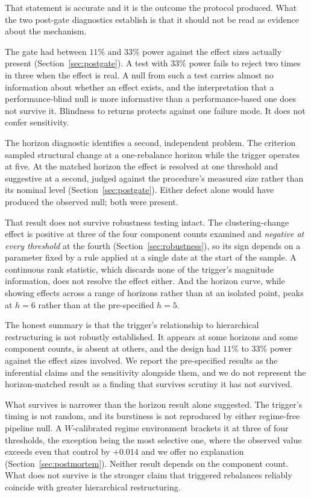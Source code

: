 \documentclass[12pt,letterpaper]{article}
\begin{document}
That statement is accurate and it is the outcome the protocol produced. What the two
post-gate diagnostics establish is that it should not be read as evidence about the
mechanism.

The gate had between $11\%$ and $33\%$ power against the effect sizes actually present
(Section~\ref{sec:postgate}). A test with $33\%$ power fails to reject two times in
three when the effect is real. A null from such a test carries almost no information
about whether an effect exists, and the interpretation that a performance-blind null is
more informative than a performance-based one does not survive it. Blindness to returns protects against one failure mode. It
does not confer sensitivity.

The horizon diagnostic identifies a second, independent problem. The criterion sampled
structural change at a one-rebalance horizon while the trigger operates at five. At the
matched horizon the effect is resolved at one threshold and suggestive at a second,
judged against the procedure's measured size rather than its nominal level
(Section~\ref{sec:postgate}). Either defect alone would have produced the observed
null; both were present.

That result does not survive robustness testing intact. The clustering-change effect is
positive at three of the four component counts examined and \emph{negative at every
threshold} at the fourth (Section~\ref{sec:robustness}), so its sign depends on a
parameter fixed by a rule applied at a single date at the start of the sample. A
continuous rank statistic, which discards none of the trigger's magnitude information,
does not resolve the effect either. And the horizon curve, while showing effects across a
range of horizons rather than at an isolated point, peaks at $h = 6$ rather than at the
pre-specified $h = 5$.

The honest summary is that the trigger's relationship to hierarchical restructuring is not
robustly established. It appears at some horizons and some component counts, is absent at
others, and the design had $11\%$ to $33\%$ power against the effect sizes involved. We
report the pre-specified results as the inferential claims and the sensitivity alongside
them, and we do not represent the horizon-matched result as a finding that survives
scrutiny it has not survived.

What survives is narrower than the horizon result alone suggested. The trigger's timing is not random, and its burstiness is not reproduced by either
regime-free pipeline null. A $W$-calibrated regime environment brackets it at three of four
thresholds, the exception being the most selective one, where the observed value exceeds
even that control by $+0.014$ and we offer no explanation
(Section~\ref{sec:postmortem}). Neither result depends on the component count.
What does not survive is the stronger claim that triggered rebalances reliably coincide
with greater hierarchical restructuring.
\end{document}
